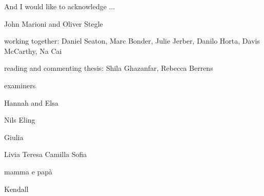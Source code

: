 
\begin{acknowledgements}      


And I would like to acknowledge ...

John Marioni and Oliver Stegle

working together: Daniel Seaton, Marc Bonder, Julie Jerber, Danilo Horta, Davis McCarthy, Na Cai

reading and commenting thesis: Shila Ghazanfar, Rebecca Berrens

examiners

Hannah and Elsa

Nils Eling

Giulia

Livia Teresa Camilla Sofia 

mamma e papà

Kendall

\end{acknowledgements}
